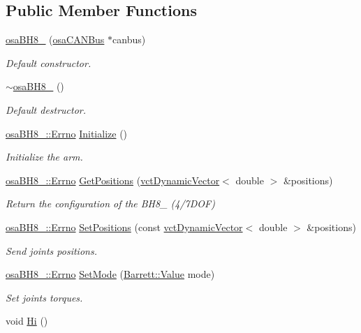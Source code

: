 \subsection*{Public Member Functions}
\begin{DoxyCompactItemize}
\item 
\hyperlink{classosa_b_h8__280_a13a1d864a85c317b8a0ab2c39b9cc515}{osa\+B\+H8\+\_} (\hyperlink{classosa_c_a_n_bus}{osa\+C\+A\+N\+Bus} $\ast$canbus)
\begin{DoxyCompactList}\small\item\em Default constructor. \end{DoxyCompactList}\item 
\hyperlink{classosa_b_h8__280_ad48ec97fc8bdb4b2c0ce91b5569ce55a}{$\sim$osa\+B\+H8\+\_} ()
\begin{DoxyCompactList}\small\item\em Default destructor. \end{DoxyCompactList}\item 
\hyperlink{classosa_b_h8__280_ab8ba653b44589ea6165d12717ff97541}{osa\+B\+H8\+\_\+::\+Errno} \hyperlink{classosa_b_h8__280_aad206fdab519475fea24f9335861c447}{Initialize} ()
\begin{DoxyCompactList}\small\item\em Initialize the arm. \end{DoxyCompactList}\item 
\hyperlink{classosa_b_h8__280_ab8ba653b44589ea6165d12717ff97541}{osa\+B\+H8\+\_\+::\+Errno} \hyperlink{classosa_b_h8__280_a13b0d3632aa4f1868060ed65e31c1fbc}{Get\+Positions} (\hyperlink{classvct_dynamic_vector}{vct\+Dynamic\+Vector}$<$ double $>$ \&positions)
\begin{DoxyCompactList}\small\item\em Return the configuration of the B\+H8\+\_ (4/7\+D\+O\+F) \end{DoxyCompactList}\item 
\hyperlink{classosa_b_h8__280_ab8ba653b44589ea6165d12717ff97541}{osa\+B\+H8\+\_\+::\+Errno} \hyperlink{classosa_b_h8__280_a970f68ef50c92a9634f3a9ed89e64144}{Set\+Positions} (const \hyperlink{classvct_dynamic_vector}{vct\+Dynamic\+Vector}$<$ double $>$ \&positions)
\begin{DoxyCompactList}\small\item\em Send joints positions. \end{DoxyCompactList}\item 
\hyperlink{classosa_b_h8__280_ab8ba653b44589ea6165d12717ff97541}{osa\+B\+H8\+\_\+::\+Errno} \hyperlink{classosa_b_h8__280_a567fdc2413e6066147e25135687f6fcb}{Set\+Mode} (\hyperlink{struct_barrett_a57ff132885344ca62e4b4b691885685b}{Barrett\+::\+Value} mode)
\begin{DoxyCompactList}\small\item\em Set joints torques. \end{DoxyCompactList}\item 
void \hyperlink{classosa_b_h8__280_a1a5810b25b84091828e36ee9eb14228f}{Hi} ()
\end{DoxyCompactItemize}


